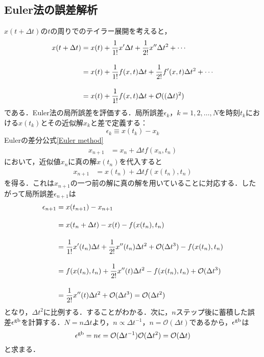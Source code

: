 \documentclass[12pt]{jsarticle}\usepackage{ifthen}\newboolean{enlarge}\setboolean{enlarge}{false}
\newcommand{\nn}{\notag \\}
\begin{document}
\subsection{Euler法の誤差解析}
$x(t+\Delta t)$の$t$の周りでのテイラー展開を考えると，
\begin{align}
	x(t+\Delta t)&=x(t) +\frac{1}{1!}x^{\prime}\Delta t +\frac{1}{2!}x^{\prime\prime}\Delta t^2+\cdots\nn[10pt]
	&=x(t) +\frac{1}{1!}f(x,t)\Delta t +\frac{1}{2!}f^{\prime}(x,t)\Delta t^2+\cdots\nn[10pt]
	&=x(t) +\frac{1}{1!}f(x,t)\Delta t +\mathcal{O}((\Delta t)^2)
\end{align}
である．Euler法の局所誤差を評価する．局所誤差$\epsilon_k$，$k=1,2,\ldots,N$を時刻$t_{k}$における$x(t_k)$とその近似解$x_k$と差で定義する：
\begin{equation}
	\epsilon_{k}\equiv x(t_{k})-x_k
\end{equation}
Eulerの差分公式\eqref{Euler method}
\begin{align}
	x_{n+1}&=x_n+\Delta t f(x_n, t_n)
\end{align}
において，近似値$x_n$に真の解$x(t_n)$を代入すると
\begin{align}
	x_{n+1}&=x(t_n)+\Delta t f(x(t_n), t_n)
\end{align}
を得る．これは$x_{n+1}$の一つ前の解に真の解を用いていることに対応する．したがって局所誤差$\epsilon_{n+1}$は
\begin{align}
	\epsilon_{n+1}&=x(t_{n+1})-x_{n+1}\nn[10pt]
	&=x(t_n+\Delta t)-x(t)-f(x(t_n), t_n)\nn[10pt]
	&=
	\frac{1}{1!}x^\prime(t_n)\Delta t +\frac{1}{2!}x^{\prime\prime}(t_n)\Delta t^2+\mathcal{O}(\Delta t^3)
	-f(x(t_n),t_n)\nn[10pt]
	&=f(x(t_n),t_n)+\frac{1}{2!}x^{\prime\prime}(t)\Delta t^2 -f(x(t_n),t_n)+\mathcal{O}(\Delta t^3)\\[10pt]
	&=\frac{1}{2!}x^{\prime\prime}(t)\Delta t^2+\mathcal{O}(\Delta t^3)
	=\mathcal{O}(\Delta t^2)
\end{align}
となり，$\Delta t^2$に比例する．することがわかる．次に，$n$ステップ後に蓄積した誤差$\epsilon^{\rm{gb}}$を計算する．$N=n\Delta t$より，$n \propto \Delta t^{-1}$，$n=\mathcal{O}(\Delta t)$であるから，$\epsilon^{\rm{gb}}$は
\begin{equation}
	\epsilon^{\rm{gb}}=n\epsilon
	=\mathcal{O}(\Delta t^{-1})\mathcal{O}(\Delta t^2)
	=\mathcal{O}(\Delta t)
\end{equation}
と求まる．
\end{document}
